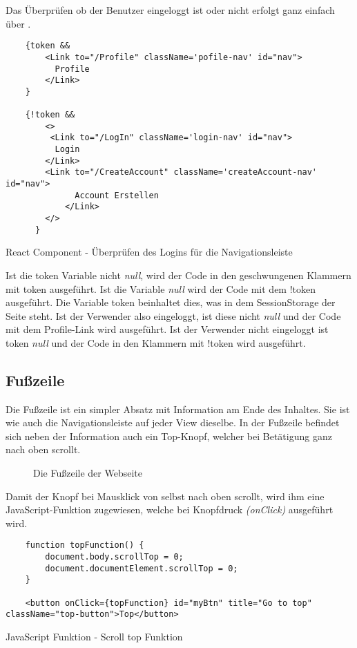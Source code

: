Das Überprüfen ob der Benutzer eingeloggt ist oder nicht erfolgt ganz einfach über \underline{}.


\begin{code}[htp]
\begin{lstlisting}
    {token && 
        <Link to="/Profile" className='pofile-nav' id="nav">
          Profile
        </Link>
    }

    {!token &&
        <>
         <Link to="/LogIn" className='login-nav' id="nav">
          Login
        </Link>
        <Link to="/CreateAccount" className='createAccount-nav' id="nav">
              Account Erstellen
            </Link>
        </>
      }
\end{lstlisting}
\caption{React Component - Überprüfen des Logins für die Navigationsleiste}
\end{code}

Ist die token Variable nicht \textit{null}, wird der Code in den geschwungenen Klammern 
mit token ausgeführt. Ist die Variable \textit{null} wird der Code mit dem !token ausgeführt. 
Die Variable token beinhaltet dies, was in dem SessionStorage der Seite steht. Ist der Verwender also eingeloggt, ist diese 
nicht \textit{null} und der Code mit dem Profile-Link wird ausgeführt. Ist der Verwender nicht eingeloggt ist token 
\textit{null} und der Code in den Klammern mit !token wird ausgeführt.

\subsection{Fußzeile}
\label{footer}

Die Fußzeile ist ein simpler Absatz mit Information am Ende des Inhaltes.
Sie ist wie auch die Navigationsleiste auf jeder View dieselbe. In der Fußzeile befindet sich neben 
der Information auch ein Top-Knopf, welcher bei Betätigung ganz nach oben scrollt. 

\begin{figure}[H]
    \begin{center}
      \caption{Die Fußzeile der Webseite}
    \end{center}
\end{figure}

Damit der Knopf bei Mausklick von selbst nach oben scrollt, wird ihm eine JavaScript-Funktion 
zugewiesen, welche bei Knopfdruck \textit{(onClick)} ausgeführt wird.

\begin{code}[htp]
\begin{lstlisting}
    function topFunction() {
        document.body.scrollTop = 0;
        document.documentElement.scrollTop = 0;
    }

    <button onClick={topFunction} id="myBtn" title="Go to top" className="top-button">Top</button>
\end{lstlisting}
\caption{JavaScript Funktion - Scroll top Funktion}
\end{code}

